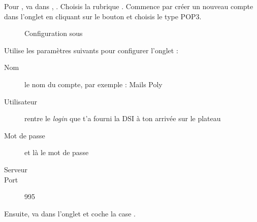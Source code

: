 Pour , va dans , . Choisis la
rubrique . Commence par cr\'eer un nouveau compte dans
l'onglet  en cliquant sur le bouton
 et choisis le type POP3.


\noindent
  \begin{figure}[!h]
    \begin{center}  
 \caption{Configuration sous }
    \end{center}
  \end{figure}


Utilise les param\`etres suivants pour configurer l'onglet  :
\begin{description}
  \item[Nom] le nom du compte, par exemple : Mails Poly
  \item[Utilisateur] rentre le \emph{login}  que t'a fourni la DSI \`a  ton arriv\'ee sur le plateau
  \item[Mot de passe] et l\`a  le mot de passe 
  \item[Serveur] 
  \item[Port] 995
\end{description}
Ensuite, va dans l'onglet  et coche la case
.

